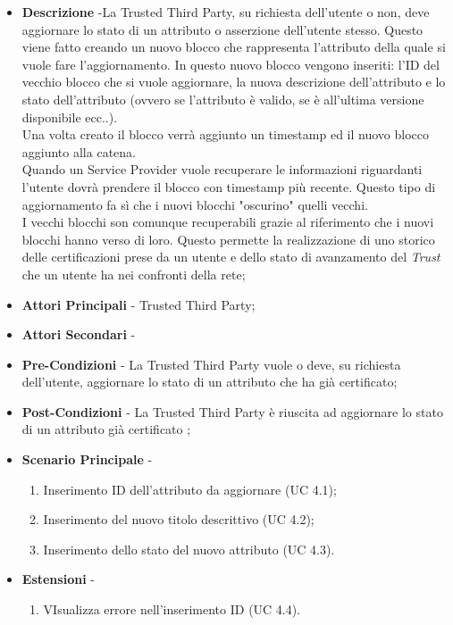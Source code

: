 \begin{itemize}
	\item \textbf{Descrizione} -La Trusted Third Party, su richiesta dell'utente o non, deve aggiornare lo stato di un attributo o asserzione dell'utente stesso.
	Questo viene fatto creando un nuovo blocco che rappresenta l'attributo della quale si vuole fare l'aggiornamento. In questo nuovo blocco vengono inseriti: l'ID del vecchio blocco che si vuole aggiornare, la nuova descrizione dell'attributo e lo stato dell'attributo (ovvero se l'attributo è valido, se è all'ultima versione disponibile ecc..).\\
	Una volta creato il blocco verrà aggiunto un timestamp ed il nuovo blocco aggiunto alla catena.\\
	Quando un Service Provider vuole recuperare le informazioni riguardanti l'utente dovrà prendere il blocco con timestamp più recente. Questo tipo di aggiornamento fa sì che i nuovi blocchi "oscurino" quelli vecchi.\\
	I vecchi blocchi son comunque recuperabili grazie al riferimento che i nuovi blocchi hanno verso di loro. Questo permette la realizzazione di uno storico delle certificazioni prese da un utente e dello stato di avanzamento del \textit{Trust} che un utente ha nei confronti della rete;
	\item \textbf{Attori Principali} - Trusted Third Party;
	\item \textbf{Attori Secondari} -
	\item \textbf{Pre-Condizioni} - La Trusted Third Party vuole o deve, su richiesta dell'utente, aggiornare lo stato di un attributo che ha già certificato;
	\item \textbf{Post-Condizioni} - La Trusted Third Party è riuscita ad aggiornare lo stato di un attributo già certificato ;
	\item \textbf{Scenario Principale} -
	\begin{enumerate}
		\item Inserimento ID dell'attributo da aggiornare (UC 4.1);
		\item Inserimento del nuovo titolo descrittivo (UC 4.2);
		\item Inserimento dello stato del nuovo attributo (UC 4.3).
	\end{enumerate}
	\item \textbf{Estensioni} -
	\begin{enumerate}
		\item VIsualizza errore nell'inserimento ID (UC 4.4).
	\end{enumerate}
\end{itemize}
